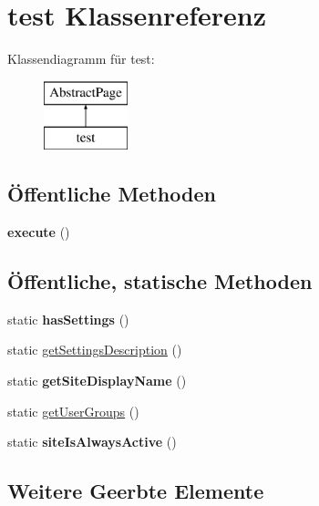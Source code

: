 \hypertarget{classtest}{}\section{test Klassenreferenz}
\label{classtest}
Klassendiagramm für test\+:\begin{figure}[H]
\begin{center}
\leavevmode
\includegraphics[height=2.000000cm]{classtest}
\end{center}
\end{figure}
\subsection*{Öffentliche Methoden}
\begin{DoxyCompactItemize}
\item 
\mbox{\label{classtest_aadc7137a7f8336aec2366e28c132a7da}} 
{\bfseries execute} ()
\end{DoxyCompactItemize}
\subsection*{Öffentliche, statische Methoden}
\begin{DoxyCompactItemize}
\item 
\mbox{\label{classtest_a3f67c28aa3f59dadb5fb7e964f9eeea5}} 
static {\bfseries has\+Settings} ()
\item 
static \mbox{\hyperlink{classtest_a18863337810ed284f01173f3ba067a3b}{get\+Settings\+Description}} ()
\item 
\mbox{\label{classtest_a3d55a63518297937b63159739e86e1b6}} 
static {\bfseries get\+Site\+Display\+Name} ()
\item 
static \mbox{\hyperlink{classtest_ab813395b4d4ee67a1a63aa27ffa4f1ea}{get\+User\+Groups}} ()
\item 
\mbox{\label{classtest_a7665605152632719def97dcb40bad884}} 
static {\bfseries site\+Is\+Always\+Active} ()
\end{DoxyCompactItemize}
\subsection*{Weitere Geerbte Elemente}


